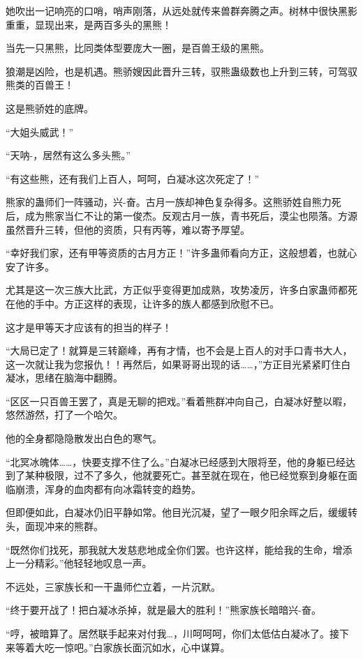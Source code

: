 \begin{this_body}
她吹出一记响亮的口哨，哨声刚落，从远处就传来兽群奔腾之声。树林中很快黑影重重，显现出来，是两百多头的黑熊！

当先一只黑熊，比同类体型要庞大一圈，是百兽王级的黑熊。

狼潮是凶险，也是机遇。熊骄嫂因此晋升三转，驭熊蛊级数也上升到三转，可驾驭熊类的百兽王！

这是熊骄姓的底牌。

“大姐头威武！”

“天呐-，居然有这么多头熊。”

“有这些熊，还有我们上百人，呵呵，白凝冰这次死定了！”

熊家的蛊师们一阵骚动，兴-奋。古月一族却神色复杂得多。这熊骄姓自熊力死后，成为熊家当仁不让的第一俊杰。反观古月一族，青书死后，漠尘也陨落。方源虽然晋升三转，但他的资质，只有丙等，难以寄予厚望。

“幸好我们家，还有甲等资质的古月方正！”许多蛊师看向方正，这般想着，也就心安了许多。

尤其是这一次三族大比武，方正似乎变得更加成熟，攻势凌厉，许多白家蛊师都死在他的手中。方正这样的表现，让许多的族人都感到欣慰不已。

这才是甲等天才应该有的担当的样子！

“大局已定了！就算是三转巅峰，再有才情，也不会是上百人的对手口青书大人，这一次就让我为您报仇！！再然后，如果哥哥出现的话……，”方正目光紧紧盯住白凝冰，思绪在脑海中翻腾。

“区区一只百兽王罢了，真是无聊的把戏。”看着熊群冲向自己，白凝冰好整以暇，悠然游然，打了一个哈欠。

他的全身都隐隐散发出白色的寒气。

“北冥冰魄体……，快要支撑不住了么。”白凝冰已经感到大限将至，他的身躯已经达到了某种极限，过不了多久，他就要死亡。甚至就在现在，他已经觉察到身躯在面临崩溃，浑身的血肉都有向冰霜转变的趋势。

但即便如此，白凝冰仍旧平静如常。他目光沉凝，望了一眼夕阳余晖之后，缓缓转头，面现冲来的熊群。

“既然你们找死，那我就大发慈悲地成全你们罢。也许这样，能给我的生命，增添上一分精彩。”他轻轻地叹息一声。

不远处，三家族长和一干蛊师伫立着，一片沉默。

“终于要开战了！把白凝冰杀掉，就是最大的胜利！”熊家族长暗暗兴-奋。

“哼，被暗算了。居然联手起来对付我…，川呵呵呵，你们太低估白凝冰了。接下来等着大吃一惊吧。”白家族长面沉如水，心中谋算。


\end{this_body}
